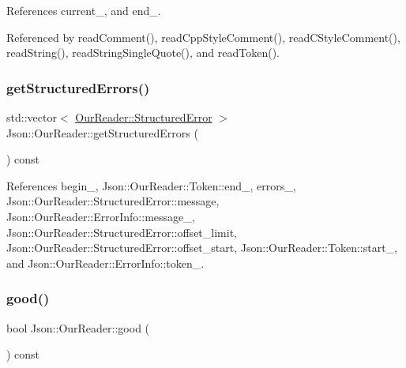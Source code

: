 References current\+\_\+, and end\+\_\+.



Referenced by read\+Comment(), read\+Cpp\+Style\+Comment(), read\+C\+Style\+Comment(), read\+String(), read\+String\+Single\+Quote(), and read\+Token().

\mbox{\label{classJson_1_1OurReader_a0eb2420a6bef89a3f3256191e6e3de6d_a0eb2420a6bef89a3f3256191e6e3de6d}} 
\subsubsection{\texorpdfstring{get\+Structured\+Errors()}{getStructuredErrors()}}
{\footnotesize\ttfamily std\+::vector$<$ \hyperlink{structJson_1_1OurReader_1_1StructuredError}{Our\+Reader\+::\+Structured\+Error} $>$ Json\+::\+Our\+Reader\+::get\+Structured\+Errors (\begin{DoxyParamCaption}{ }\end{DoxyParamCaption}) const}



References begin\+\_\+, Json\+::\+Our\+Reader\+::\+Token\+::end\+\_\+, errors\+\_\+, Json\+::\+Our\+Reader\+::\+Structured\+Error\+::message, Json\+::\+Our\+Reader\+::\+Error\+Info\+::message\+\_\+, Json\+::\+Our\+Reader\+::\+Structured\+Error\+::offset\+\_\+limit, Json\+::\+Our\+Reader\+::\+Structured\+Error\+::offset\+\_\+start, Json\+::\+Our\+Reader\+::\+Token\+::start\+\_\+, and Json\+::\+Our\+Reader\+::\+Error\+Info\+::token\+\_\+.

\mbox{\label{classJson_1_1OurReader_a63c7d874fa379397e0a5fa65f0843845_a63c7d874fa379397e0a5fa65f0843845}} 
\subsubsection{\texorpdfstring{good()}{good()}}
{\footnotesize\ttfamily bool Json\+::\+Our\+Reader\+::good (\begin{DoxyParamCaption}{ }\end{DoxyParamCaption}) const}



